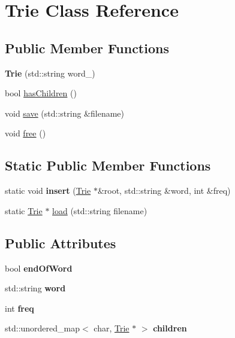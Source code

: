 \hypertarget{classTrie}{}\section{Trie Class Reference}
\label{classTrie}
\subsection*{Public Member Functions}
\begin{DoxyCompactItemize}
\item 
\mbox{\label{classTrie_a57187de33536560d263f24c5f40baf7b}} 
{\bfseries Trie} (std\+::string word\+\_\+)
\item 
bool \hyperlink{classTrie_ac3e8d2f809da499593ca4ff362fee58b}{has\+Children} ()
\item 
void \hyperlink{classTrie_ab52d04199524ab434e1eb3df178c943e}{save} (std\+::string \&filename)
\item 
void \hyperlink{classTrie_acc37b98a99d3262cf5d211070bca71d9}{free} ()
\end{DoxyCompactItemize}
\subsection*{Static Public Member Functions}
\begin{DoxyCompactItemize}
\item 
\mbox{\label{classTrie_a411a79d7708729a2f7fd4b669d0f2a30}} 
static void {\bfseries insert} (\hyperlink{classTrie}{Trie} $\ast$\&root, std\+::string \&word, int \&freq)
\item 
static \hyperlink{classTrie}{Trie} $\ast$ \hyperlink{classTrie_afc0913b4f93f5b86325147333f73029f}{load} (std\+::string filename)
\end{DoxyCompactItemize}
\subsection*{Public Attributes}
\begin{DoxyCompactItemize}
\item 
\mbox{\label{classTrie_a97b59f231dfea3c83dc7371ad4c87299}} 
bool {\bfseries end\+Of\+Word}
\item 
\mbox{\label{classTrie_a6acfcc977fc3b9a751cd6c3f7166e710}} 
std\+::string {\bfseries word}
\item 
\mbox{\label{classTrie_a5f02fe3070d58c4a6731bccf9be36cd9}} 
int {\bfseries freq}
\item 
\mbox{\label{classTrie_a56ee68454a585a7fbdcf52abb35fc85e}} 
std\+::unordered\+\_\+map$<$ char, \hyperlink{classTrie}{Trie} $\ast$ $>$ {\bfseries children}
\end{DoxyCompactItemize}
